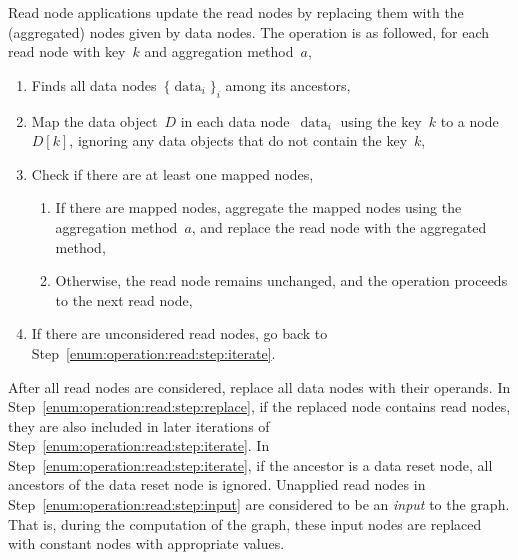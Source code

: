 \documentclass{article}
\DeclareMathOperator{\dataNode}{data}
\begin{document}
Read node applications update the read nodes by replacing them with the (aggregated) nodes given by data nodes.
The operation is as followed, for each read node with key~$k$ and aggregation method~$a$,
\begin{enumerate}
  \item\label{enum:operation:read:step:iterate} Finds all data nodes~$\{\dataNode_i\}_i$ among its ancestors,
  \item Map the data object~$D$ in each data node~$\dataNode_i$ using the key~$k$ to a node~$D[k]$, ignoring any data objects that do not contain the key~$k$,
  \item Check if there are at least one mapped nodes,
        \begin{enumerate}
          \item\label{enum:operation:read:step:replace} If there are mapped nodes, aggregate the mapped nodes using the aggregation method~$a$, and replace the read node with the aggregated method,
          \item\label{enum:operation:read:step:input} Otherwise, the read node remains unchanged, and the operation proceeds to the next read node,
        \end{enumerate}
  \item If there are unconsidered read nodes, go back to Step~\ref{enum:operation:read:step:iterate}.
\end{enumerate}
%
After all read nodes are considered, replace all data nodes with their operands.
In Step~\ref{enum:operation:read:step:replace}, if the replaced node contains read nodes, they are also included in later iterations of Step~\ref{enum:operation:read:step:iterate}.
In Step~\ref{enum:operation:read:step:iterate}, if the ancestor is a data reset node, all ancestors of the data reset node is ignored.
Unapplied read nodes in Step~\ref{enum:operation:read:step:input} are considered to be an \emph{input} to the graph.
That is, during the computation of the graph, these input nodes are replaced with constant nodes with appropriate values.
\end{document}
